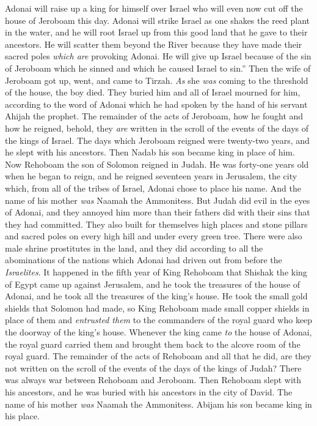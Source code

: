 \begin{biblechapter}
\verse Adonai will raise up a king for himself over Israel who will even now cut off the house of Jeroboam this day.
\verse Adonai will strike Israel as one shakes the reed plant in the water, and he will root Israel up from this good land that he gave to their ancestors. He will scatter them beyond the River because they have made their sacred poles \textit{which are} provoking Adonai.
\verse He will give up Israel because of the sin of Jeroboam which he sinned and which he caused Israel to sin.”
\verse Then the wife of Jeroboam got up, went, and came to Tirzah. \textit{As} she \textit{was} coming to the threshold of the house, the boy died.
\verse They buried him and all of Israel mourned for him, according to the word of Adonai which he had spoken by the hand of his servant Ahijah the prophet.
\verse The remainder of the acts of Jeroboam, how he fought and how he reigned, behold, they \textit{are} written in the scroll of the events of the days of the kings of Israel.
\verse The days which Jeroboam reigned were twenty-two years, and he slept with his ancestors. Then Nadab his son became king in place of him.
 Now Rehoboam the son of Solomon reigned in Judah. He was forty-one years old when he began to reign, and he reigned seventeen years in Jerusalem, the city which, from all of the tribes of Israel, Adonai chose to place his name. And the name of his mother \textit{was} Naamah the Ammonitess.
\verse But Judah did evil in the eyes of Adonai, and they annoyed him more than their fathers did with their sins that they had committed.
\verse They also built for themselves high places and stone pillars and sacred poles on every high hill and under every green tree.
\verse There were also male shrine prostitutes in the land, and they did according to all the abominations of the nations which Adonai had driven out from before the \textit{Israelites}.
 It happened in the fifth year of King Rehoboam that Shishak the king of Egypt came up against Jerusalem,
\verse and he took the treasures of the house of Adonai, and he took all the treasures of the king’s house. He took the small gold shields that Solomon had made,
\verse so King Rehoboam made small copper shields in place of them and \textit{entrusted them} to the commanders of the royal guard who keep the doorway of the king’s house.
\verse Whenever the king came \textit{to} the house of Adonai, the royal guard carried them and brought them back to the alcove room of the royal guard.
\verse The remainder of the acts of Rehoboam and all that he did, are they not written on the scroll of the events of the days of the kings of Judah?
\verse There was always war between Rehoboam and Jeroboam.
\verse Then Rehoboam slept with his ancestors, and he was buried with his ancestors in the city of David. The name of his mother \textit{was} Naamah the Ammonitess. Abijam his son became king in his place.
\end{biblechapter}

